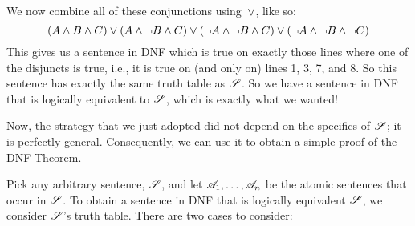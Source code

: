 We now combine all of these conjunctions using~$\vee$, like so:
$$(A \wedge B \wedge C) \vee (A \wedge \neg B \wedge C) \vee (\neg A \wedge \neg B \wedge C) \vee (\neg A \wedge \neg B \wedge \neg C)$$\label{longDNF}
This gives us a sentence in DNF which is true on exactly those lines where one of the disjuncts is true, i.e., it is true on (and only on) lines 1, 3, 7, and 8. So this sentence has exactly the same truth table as $\mathscr{S}$. So we have a sentence in DNF that is logically equivalent to $\mathscr{S}$, which is exactly what we wanted!

Now, the strategy that we just adopted did not depend on the specifics of $\mathscr{S}$; it is perfectly general. Consequently, we can use it to obtain a simple proof of the DNF Theorem.

Pick any arbitrary sentence, $\mathscr{S}$, and let $\mathscr{A}_1, \ldots, \mathscr{A}_n$ be the atomic sentences that occur in $\mathscr{S}$. To obtain a sentence in DNF that is logically equivalent $\mathscr{S}$, we consider $\mathscr{S}$'s truth table. There are two cases to consider:
